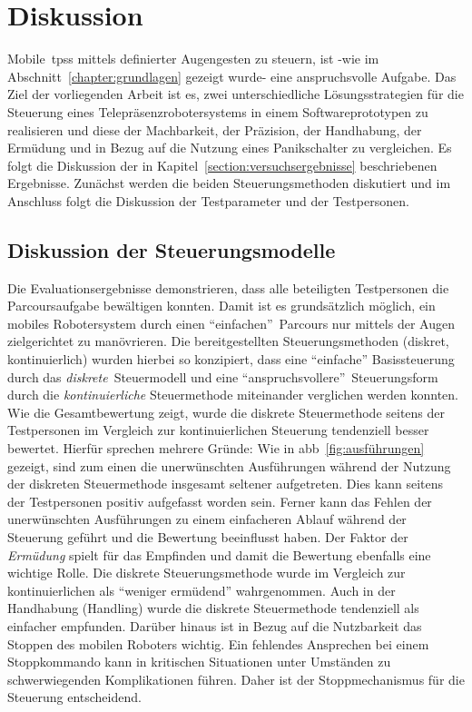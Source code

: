 \section{Diskussion}
\label{section:Diskusion}
Mobile~\aclp{tps} mittels definierter Augengesten zu steuern, ist -wie im Abschnitt~\ref{chapter:grundlagen} gezeigt wurde- eine anspruchsvolle Aufgabe. Das Ziel der vorliegenden Arbeit ist es, zwei unterschiedliche Lösungsstrategien für die Steuerung eines Telepräsenzrobotersystems in einem Softwareprototypen zu realisieren und diese \bzgl der Machbarkeit, der Präzision, der Handhabung, der Ermüdung und in Bezug auf die Nutzung eines Panikschalter zu vergleichen.
Es folgt die Diskussion der in Kapitel~\ref{section:versuchsergebnisse} beschriebenen Ergebnisse. Zunächst werden die beiden Steuerungsmethoden diskutiert und im Anschluss folgt die Diskussion der Testparameter und der Testpersonen.


\subsection{Diskussion der Steuerungsmodelle}

Die \og Evaluationsergebnisse demonstrieren, dass alle beteiligten Testpersonen die Parcoursaufgabe bewältigen konnten. Damit ist es grundsätzlich möglich, ein mobiles Robotersystem durch einen \enquote{einfachen}~Parcours nur mittels der Augen zielgerichtet zu manövrieren. Die bereitgestellten Steuerungsmethoden (diskret, kontinuierlich) wurden hierbei so konzipiert, dass eine \enquote{einfache} Basissteuerung durch das \textit{diskrete}~Steuermodell und eine \enquote{anspruchsvollere}~Steuerungsform durch die \textit{kontinuierliche} Steuermethode miteinander verglichen werden konnten. 
Wie die Gesamtbewertung zeigt, wurde die diskrete Steuermethode seitens der Testpersonen im Vergleich zur kontinuierlichen Steuerung tendenziell besser bewertet. Hierfür sprechen mehrere Gründe: Wie in \acs{abb}~\ref{fig:ausführungen} gezeigt, sind zum einen die unerwünschten Ausführungen während der Nutzung der diskreten Steuermethode insgesamt seltener aufgetreten. Dies kann seitens der Testpersonen positiv aufgefasst worden sein. Ferner kann das Fehlen der unerwünschten Ausführungen zu einem einfacheren Ablauf während der Steuerung geführt und die Bewertung beeinflusst haben. Der Faktor der \textit{Ermüdung} spielt für das Empfinden und damit die Bewertung ebenfalls eine wichtige Rolle. Die diskrete Steuerungsmethode wurde im Vergleich zur kontinuierlichen  als \enquote{weniger ermüdend} wahrgenommen. Auch in der Handhabung (Handling) wurde die diskrete Steuermethode tendenziell als einfacher empfunden. Darüber hinaus ist in Bezug auf die Nutzbarkeit das Stoppen des mobilen Roboters wichtig. Ein fehlendes Ansprechen bei einem Stoppkommando kann in kritischen Situationen unter Umständen zu schwerwiegenden Komplikationen führen. Daher ist der Stoppmechanismus für die Steuerung entscheidend.

